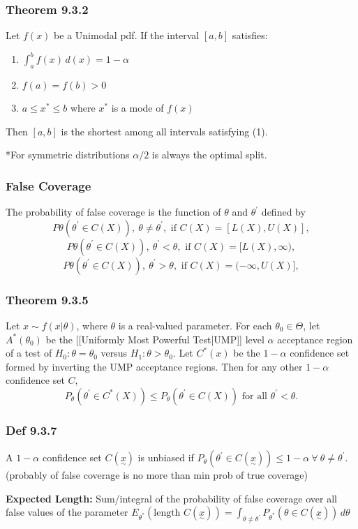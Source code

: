 		\subsubsection{Theorem 9.3.2}
			Let $f(x)$ be a Unimodal pdf. If the interval $[a,b]$ satisfies:
			\begin{enumerate}
				\item $\int_{a}^{b}f(x)\,d(x) = 1-\alpha$
				\item $f(a) = f(b) >0$
				\item $a\leq x^*\leq b$ where $x^*$ is a mode of $f(x)$
			\end{enumerate}
			Then $[a,b]$ is the shortest among all intervals satisfying (1).
			
			*For symmetric distributions \(\alpha/2\) is always the optimal split.
			
		\subsubsection{False Coverage}
			The probability of false coverage is the function of $\theta$ and $\theta^\prime$ defined by
			\[P\theta (\theta^\prime\in C(X)),\ \theta\ne \theta^\prime,\text{ if }C(X) = [L(X),U(X)],\]
			\[P\theta (\theta^\prime\in C(X)),\ \theta^\prime < \theta,\text{ if }C(X) = [L(X), \infty), \]
			\[P\theta (\theta^\prime\in C(X)),\ \theta^\prime > \theta,\text{ if }C(X) = (-\infty, U(X)],\]

		\subsubsection{Theorem 9.3.5}
			Let $x\sim f(x|\theta)$, where $\theta$ is a real-valued parameter. For each $\theta_0\in\Theta$, let $A^*(\theta_0)$ be the [[Uniformly Most Powerful Test|UMP]] level $\alpha$  acceptance region of a test of  $H_0 : \theta = \theta_0$ versus $H_1: \theta > \theta_0$. Let $C^*(x)$ be the $1-\alpha$ confidence set formed by inverting the UMP
			acceptance regions. Then for any other $1 - \alpha$ confidence set $C$,
			$$P_\theta(\theta^\prime\in C^*(X)) \leq P_\theta(\theta^\prime\in C(X)) \text{ for all }\theta^\prime < \theta.$$
			
		\subsubsection{Def 9.3.7}
			A $1-\alpha$ confidence set $C(\underset{\sim}{x})$ is unbiased if 
			$P_\theta(\theta^\prime\in C(\underset{\sim}{x}))\leq1-\alpha\ \forall\ \theta\neq\theta^\prime$.
			(probably of false coverage is no more than min prob of true coverage)
			
			\textbf{Expected Length:}
			Sum/integral of the probability of false coverage over all false values of the parameter
			$E_{\theta^*}(\text{length }C(\underset{\sim}{x})) = \int_{\theta\neq\theta^\prime}P_{\theta^*}(\theta\in C(\underset{\sim}{x}))\, d\theta$
			
			

			
			
			
